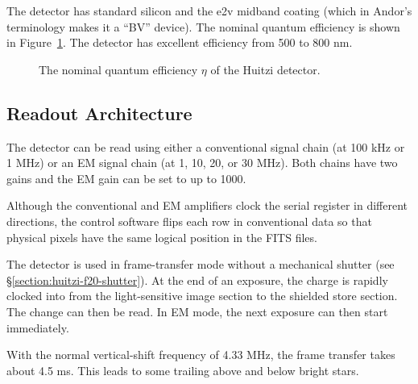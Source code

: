 The detector has standard silicon and the e2v midband coating (which in Andor's terminology makes it a “BV” device). The nominal quantum efficiency is shown in Figure~\ref{figure:huitzi-f20-detector-quantum-efficiency}. The detector has excellent efficiency from 500 to 800 nm.

\begin{figure}
\begin{center}
\end{center}
\caption{The nominal quantum efficiency $\eta$ of the Huitzi detector.}
\label{figure:huitzi-f20-detector-quantum-efficiency}
\end{figure}

\subsection{Readout Architecture}

The detector can be read using either a conventional signal chain (at 100 kHz or 1 MHz) or an EM signal chain (at 1, 10, 20, or 30 MHz). Both chains have two gains and the EM gain can be set to up to 1000. 

Although the conventional and EM amplifiers clock the serial register in different directions, the control software flips each row in conventional data so that physical pixels have the same logical position in the FITS files.

The detector is used in frame-transfer mode without a mechanical shutter (see \S\ref{section:huitzi-f20-shutter}). At the end of an exposure, the charge is rapidly clocked into from the light-sensitive image section to the shielded store section. The change can then be read. In EM mode, the next exposure can then start immediately.

With the normal vertical-shift frequency of 4.33 MHz, the frame transfer takes about 4.5 ms. This leads to some trailing above and below bright stars.

